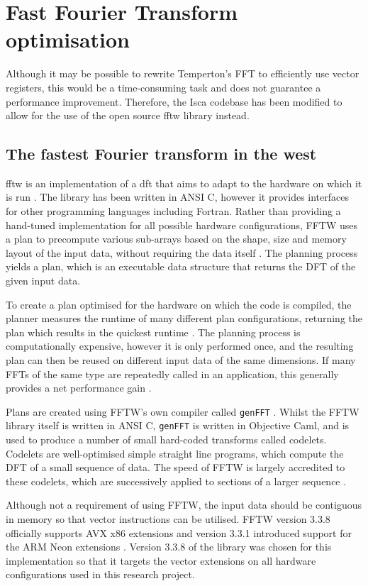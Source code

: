 \documentclass[a4paper,11pt]{report}
\begin{document}
\section[FFT optimisation]{Fast Fourier Transform optimisation}
Although it may be possible to rewrite Temperton's FFT to efficiently use vector registers, this would be a time-consuming task and does not guarantee a performance improvement. Therefore, the Isca codebase has been modified to allow for the use of the open source \gls{fftw} library instead.


\subsection{The fastest Fourier transform in the west}
\gls{fftw} is an implementation of a \gls{dft} that aims to adapt to the hardware on which it is run \cite{frigo2005design}. The library has been written in ANSI C, however it provides interfaces for other programming languages including Fortran. Rather than providing a hand-tuned implementation for all possible hardware configurations, FFTW uses a plan to precompute various sub-arrays based on the shape, size and memory layout of the input data, without requiring the data itself \cite{frigo2005design}. The planning process yields a plan, which is an executable data structure that returns the DFT of the given input data. 
\par
To create a plan optimised for the hardware on which the code is compiled, the planner measures the runtime of many different plan configurations, returning the plan which results in the quickest runtime \cite{frigo2005design}. The planning process is computationally expensive, however it is only performed once, and the resulting plan can then be reused on different input data of the same dimensions. If many FFTs of the same type are repeatedly called in an application, this generally provides a net performance gain \cite{frigo2003fftw}.
\par
Plans are created using FFTW's own compiler called \texttt{genFFT}  \cite{frigo2005design}. Whilst the FFTW library itself is written in ANSI C, \texttt{genFFT} is written in Objective Caml, and is used to produce a number of small hard-coded transforms called codelets. Codelets are well-optimised simple straight line programs, which compute the DFT of a small sequence of data. The speed of FFTW is largely accredited to these codelets, which are successively applied to sections of a larger sequence \cite{frigo2005design}. 
\par
Although not a requirement of using FFTW, the input data should be contiguous in memory so that vector instructions can be utilised. FFTW version 3.3.8 officially supports AVX x86 extensions and version 3.3.1 introduced support for the ARM Neon extensions \cite{frigo2003fftw}. Version 3.3.8 of the library was chosen for this implementation so that it targets the vector extensions on all hardware configurations used in this research project. 
\end{document}
